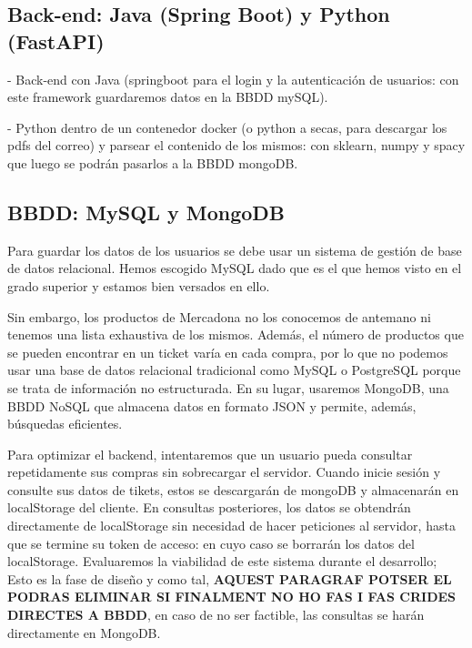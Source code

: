 \documentclass[a4paper,12pt]{report}
\begin{document}
	
		 
		\subsection{Back-end: Java (Spring Boot) y Python (FastAPI)}
		
			- Back-end con Java (springboot para el login y la autenticación de usuarios: con este framework guardaremos datos en la BBDD mySQL).
			
			- Python dentro de un contenedor docker (o python a secas, para descargar los pdfs del correo) y parsear el contenido de los mismos: con sklearn, numpy y spacy que luego se podrán pasarlos a la BBDD mongoDB.
			
		\subsection{BBDD: MySQL y MongoDB}
		
		
		Para guardar los datos de los usuarios se debe usar un sistema de gestión de base de datos relacional. Hemos escogido MySQL dado que es el que hemos visto en el grado superior y estamos bien versados en ello.
		
		Sin embargo, los productos de Mercadona no los conocemos de antemano ni tenemos una lista exhaustiva de los mismos. Además, el número de productos que se pueden encontrar en un ticket varía en cada compra, por lo que no podemos usar una base de datos relacional tradicional como MySQL o PostgreSQL porque se trata de información no estructurada. En su lugar, usaremos MongoDB, una BBDD NoSQL que almacena datos en formato JSON y permite, además, búsquedas eficientes.
		
		Para optimizar el backend, intentaremos que un usuario pueda consultar repetidamente sus compras sin sobrecargar el servidor. Cuando inicie sesión y consulte sus datos de tikets, estos se descargarán de mongoDB y almacenarán en localStorage del cliente. En consultas posteriores, los datos se obtendrán directamente de localStorage sin necesidad de hacer peticiones al servidor, hasta que se termine su token de acceso: en cuyo caso se borrarán los datos del localStorage. Evaluaremos la viabilidad de este sistema durante el desarrollo; Esto es la fase de diseño y como tal, \textbf{AQUEST PARAGRAF POTSER EL PODRAS ELIMINAR SI FINALMENT NO HO FAS I FAS CRIDES DIRECTES A BBDD}, en caso de no ser factible, las consultas se harán directamente en MongoDB.
		
\end{document}
